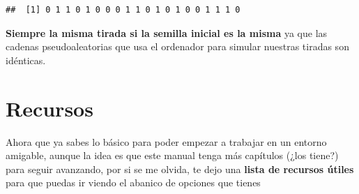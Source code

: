 \documentclass[11pt,]{book}
\begin{document}
\begin{verbatim}
##  [1] 0 1 1 0 1 0 0 0 1 1 0 1 0 1 0 0 1 1 1 0
\end{verbatim}

\textbf{Siempre la misma tirada si la semilla inicial es la misma} ya que las cadenas pseudoaleatorias que usa el ordenador para simular nuestras tiradas son idénticas.

\hypertarget{recursos}{%
\section{Recursos}\label{recursos}}

Ahora que ya sabes lo básico para poder empezar a trabajar en un entorno amigable, aunque la idea es que este manual tenga más capítulos (¿los tiene?) para seguir avanzando, por si se me olvida, te dejo una \textbf{lista de recursos útiles} para que puedas ir viendo el abanico de opciones que tienes
\end{document}
